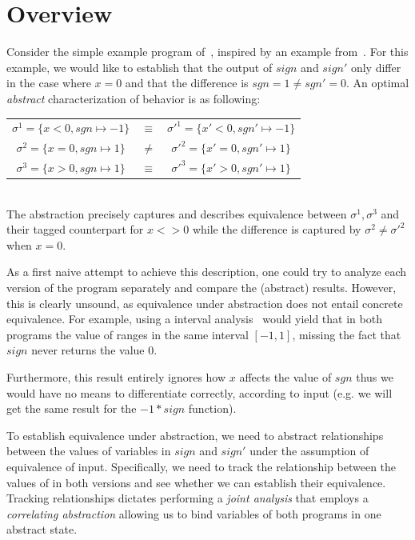 \section{Overview}



Consider the simple example program of~, inspired by an example from~\cite{MauborgneRival07}. For this example, we would like to establish that the output of $sign$ and $sign'$ only differ in the case where $x=0$ and that the difference is $sgn = 1 \neq sgn' = 0$. An optimal \emph{abstract} characterization of behavior is as following:
\\
\begin{tabular}{ccc}
$\sigma^1 = \{x < 0, sgn \mapsto -1\}$ & $\equiv$ & $\sigma'^1 = \{x' < 0, sgn' \mapsto -1\}$
\\
$\sigma^2 = \{x = 0, sgn \mapsto 1\}$ & $\neq$ & $\sigma'^2 = \{x' = 0, sgn' \mapsto 1\}$
\\
$\sigma^3 = \{x > 0, sgn \mapsto 1\}$ & $\equiv$ & $\sigma'^3 = \{x' > 0, sgn' \mapsto 1\}$
\\
\end{tabular}
\\
The abstraction precisely captures and describes equivalence between $\sigma^1,\sigma^3$ and their tagged counterpart for $x <> 0$ while the difference is captured by $\sigma^2 \neq \sigma'^2$ when $x = 0$.

As a first naive attempt to achieve this description, one could try to analyze each version of the program separately and compare the (abstract) results. However, this is clearly unsound, as equivalence under abstraction does not entail concrete equivalence. For example, using a interval analysis~\cite{TODO} would yield that in both programs the value of  ranges in the same interval $[-1,1]$, missing the fact that $sign$ never returns the value $0$.


Furthermore, this result entirely ignores how $x$ affects the value of $sgn$ thus we would have no means to differentiate correctly, according to input (e.g. we will get the same result for the $-1 * sign$ function).

To establish equivalence under abstraction, we need to abstract relationships between the values of variables in $sign$ and $sign'$ under the assumption of equivalence of input. Specifically, we need to track the relationship between the values of  in both versions and see whether we can establish their equivalence. Tracking relationships dictates performing a \emph{joint analysis} that employs a \emph{correlating abstraction} allowing us to bind variables of both programs in one abstract state.

